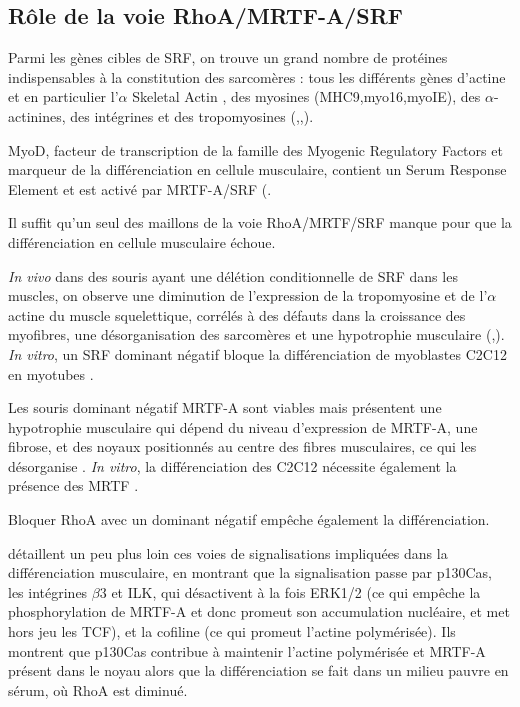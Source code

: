 \subsection{Rôle de la voie RhoA/MRTF-A/SRF}

Parmi les gènes cibles de SRF, on trouve un grand nombre de protéines indispensables à la constitution des sarcomères :  tous les différents gènes d'actine et en particulier l'$\alpha$ Skeletal Actin , des myosines (MHC9,myo16,myoIE), des $\alpha$-actinines, des intégrines et des tropomyosines (\cite{selvaraj_2004},\cite{charvet_2006},\cite{esnault_rho-actin_2014}).

MyoD, facteur de transcription de la famille des Myogenic Regulatory Factors et marqueur de la différenciation en cellule musculaire, contient un Serum Response Element \cite{l'honore_2003} et est activé par MRTF-A/SRF (\cite{Mokalled_2011}. 

Il suffit qu'un seul des maillons de la voie RhoA/MRTF/SRF manque pour que la différenciation en cellule musculaire échoue. 

\textit{In vivo} dans des souris ayant une délétion conditionnelle de SRF dans les muscles, on observe une diminution de l'expression de la tropomyosine et de l'$\alpha$ actine du muscle squelettique, corrélés à des défauts dans la croissance des myofibres, une désorganisation des sarcomères et une hypotrophie musculaire (\cite{charvet_2006},\cite{li_requirement_2005}). \textit{In vitro}, un SRF dominant négatif bloque la différenciation de myoblastes C2C12 en myotubes \cite{wei_1998}.

Les souris dominant négatif MRTF-A sont viables mais présentent une hypotrophie musculaire qui dépend du niveau d'expression de MRTF-A, une fibrose, et des noyaux positionnés au centre des fibres musculaires, ce qui les désorganise \cite{li_requirement_2005}. \textit{In vitro}, la différenciation des C2C12 nécessite également la présence des MRTF \cite{selvaraj_megakaryoblastic_2003}. 

Bloquer RhoA avec un dominant négatif \cite{wei_1998} empêche également la différenciation.

\cite{kawauchi_p130cas-dependent_2012} détaillent un peu plus loin ces voies de signalisations impliquées dans la différenciation musculaire, en montrant que la signalisation passe par p130Cas, les intégrines $\beta$3 et ILK, qui désactivent à la fois ERK1/2 (ce qui empêche la phosphorylation de MRTF-A et donc promeut son accumulation nucléaire, et met hors jeu les TCF), et la cofiline (ce qui promeut l'actine polymérisée). Ils montrent que p130Cas contribue à maintenir l'actine polymérisée et MRTF-A présent dans le noyau alors que la différenciation se fait dans un milieu pauvre en sérum, où RhoA est diminué. 
 
